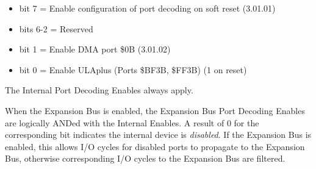 \begin{itemize}
\item bit 7 = Enable configuration of port decoding on soft reset (3.01.01)
\item bits 6-2 = Reserved
\item bit 1 = Enable DMA port \$0B (3.01.02)
\item bit 0 = Enable ULAplus (Ports \$BF3B, \$FF3B) (1 on reset)
\end{itemize}

The Internal Port Decoding Enables always apply.

When the Expansion Bus is enabled, the Expansion Bus Port Decoding
Enables are logically ANDed with the Internal Enables. A result of 0
for the corresponding bit indicates the internal device is
\emph{disabled}. If the Expansion Bus is enabled, this allows
I/O cycles for disabled ports to propagate to the Expansion Bus,
otherwise corresponding I/O cycles to the Expansion Bus are filtered.

